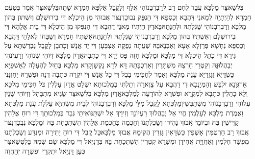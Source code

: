\documentclass[../main/main.tex]{subfiles}
\begin{document}
\begin{multicols*}{\ncols}
בֵּלְשַׁאצַּר מַלְכָּא עֲבַד לְחֶם רַב לְרַבְרְבָנוֹהִי אֲלַף וְלָקֳבֵל אַלְפָּא חַמְרָא שָׁתֵה\PreVerseSpace{}בֵּלְשַׁאצַּר אֲמַר בִּטְעֵם חַמְרָא לְהַיְתָיָה לְמָאנֵי דַּהֲבָא וְכַסְפָּא דִּי הַנְפֵּק נְבוּכַדְנֶצֹּר אֲבוּהִי מִן הֵיכְלָא דִּי בִירוּשְׁלֶם וְיִשְׁתּוֹן בְּהוֹן מַלְכָּא וְרַבְרְבָנוֹהִי שֵׁגְלָתֵהּ וּלְחֵנָתֵהּ\PreVerseSpace{}בֵּאדַיִן הַיְתִיו מָאנֵי דַהֲבָא דִּי הַנְפִּקוּ מִן הֵיכְלָא דִּי בֵית אֱלָהָא דִּי בִירוּשְׁלֶם וְאִשְׁתִּיו בְּהוֹן מַלְכָּא וְרַבְרְבָנוֹהִי שֵׁגְלָתֵהּ וּלְחֵנָתֵהּ\PreVerseSpace{}אִשְׁתִּיו חַמְרָא וְשַׁבַּחוּ לֵאלָהֵי דַּהֲבָא וְכַסְפָּא נְחָשָׁא פַרְזְלָא אָעָא וְאַבְנָא\PreVerseSpace{}בַּהּ שַׁעֲתָה נְפַקָה\SubEnd{} אֶצְבְּעָן דִּי יַד אֱנָשׁ וְכָתְבָן לָקֳבֵל נֶבְרַשְׁתָּא עַל גִּירָא דִּי כְתַל הֵיכְלָא דִּי מַלְכָּא וּמַלְכָּא חָזֵה פַּס יְדָא דִּי כָתְבָה\PreVerseSpace{}אֱדַיִן מַלְכָּא זִיוֺהִי שְׁנוֹהִי וְרַעְיֹנֹהִי יְבַהֲלוּנֵּהּ וְקִטְרֵי חַרְצֵהּ מִשְׁתָּרַיִן וְאַרְכֻבָּתֵהּ דָּא לְדָא נָקְשָׁן\PreVerseSpace{}קָרֵא מַלְכָּא בְּחַיִל לְהֶעָלָה לְאָשְׁפַיָּא כַּשְׂדָּיֵא וְגָזְרַיָּא עָנֵה מַלְכָּא וְאָמַר לְחַכִּימֵי בָבֶל דִּי כָל אֱנָשׁ דִּי יִקְרֵה כְּתָבָה דְנָה וּפִשְׁרֵהּ יְחַוִּנַּנִי אַרְגְּוָנָא יִלְבַּשׁ וְהַמְיָנְכָא\SubEnd{} דִי דַהֲבָא עַל צַוְּארֵהּ וְתַלְתִּי בְמַלְכוּתָא יִשְׁלַט \ClosedSection{}אֱדַיִן עָלְלִין כֹּל חַכִּימֵי מַלְכָּא וְלָא כָהֲלִין כְּתָבָא לְמִקְרֵא וּפִשְׁרָא לְהוֹדָעָה לְמַלְכָּא\PreVerseSpace{}אֱדַיִן מַלְכָּא בֵלְשַׁאצַּר שַׂגִּיא מִתְבָּהַל וְזִיוֺהִי שָׁנַיִן עֲלוֹהִי וְרַבְרְבָנוֹהִי מִשְׁתַּבְּשִׁין\PreVerseSpace{}מַלְכְּתָא לָקֳבֵל מִלֵּי מַלְכָּא וְרַבְרְבָנוֹהִי לְבֵית מִשְׁתְּיָא עַלְלַת עֲנָת מַלְכְּתָא וַאֲמֶרֶת מַלְכָּא לְעָלְמִין חֱיִי אַל יְבַהֲלוּךְ רַעְיוֹנָךְ וְזִיוָיךְ אַל יִשְׁתַּנּוֹ\PreVerseSpace{}אִיתַי גְּבַר בְּמַלְכוּתָךְ דִּי רוּחַ אֱלָהִין קַדִּישִׁין בֵּהּ וּבְיוֹמֵי אֲבוּךְ נַהִירוּ וְשָׂכְלְתָנוּ וְחָכְמָה כְּחָכְמַת אֱלָהִין הִשְׁתְּכַחַת בֵּהּ וּמַלְכָּא נְבֻכַדְנֶצֹּר אֲבוּךְ רַב חַרְטֻמִּין אָשְׁפִין כַּשְׂדָּאִין גָּזְרִין הֲקִימֵהּ אֲבוּךְ מַלְכָּא\PreVerseSpace{}כָּל קֳבֵל דִּי רוּחַ יַתִּירָה וּמַנְדַּע וְשָׂכְלְתָנוּ מִפְשַׁר\SubEnd{} חֶלְמִין וְאַחֲוָיַת אֲחִידָן וּמִשְׁרֵא\SubEnd{} קִטְרִין הִשְׁתְּכַחַת בֵּהּ בְּדָנִיֵּאל דִּי מַלְכָּא שָׂם שְׁמֵהּ בֵּלְטְשַׁאצַּר כְּעַן דָּנִיֵּאל יִתְקְרֵי וּפִשְׁרָה יְהַחֲוֵה\OpenSection{}\par

\end{multicols*}
\end{document}
